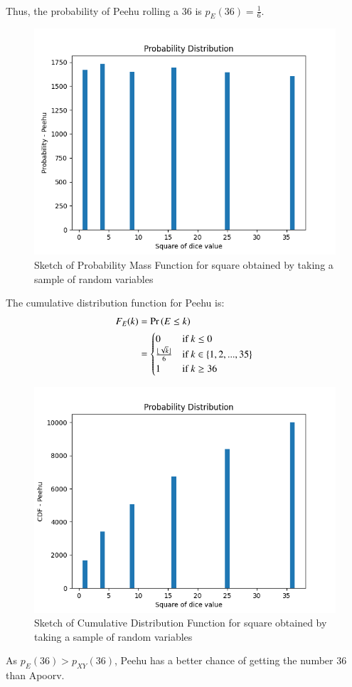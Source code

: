 \documentclass[journal,12pt,twocolumn]{IEEEtran}
\theoremstyle{remark}
\begin{document}
\begin{enumerate}
\begin{align}
\end{align}
Thus, the probability of Peehu rolling a 36 is $p_E(36) = \frac{1}{6}$.
\begin{figure}[h!]
    \includegraphics[width=\columnwidth]{plots/PDF - Peehu.png}
    \caption{Sketch of Probability Mass Function for square obtained by taking a sample of random variables}
\end{figure}
The cumulative distribution function for Peehu is:
\begin{align}
    F_E(k) &= \Pr\left(E \leq k\right)\\
    &= 
    \begin{cases}
        0 & \text{if }k \leq 0\\
        \frac{\lfloor\sqrt{k}\rfloor}{6} & \text{if }k \in \{1, 2, ..., 35\}\\
        1 & \text{if }k \geq 36
    \end{cases}
\end{align}
\begin{figure}[h!]
    \includegraphics[width=\columnwidth]{plots/CDF - Peehu.png}
    \caption{Sketch of Cumulative Distribution Function for square obtained by taking a sample of random variables}
\end{figure}
\end{enumerate}
As $p_{E}(36) > p_{XY}(36)$, Peehu has a better chance of getting the number 36 than Apoorv.
\end{document}
